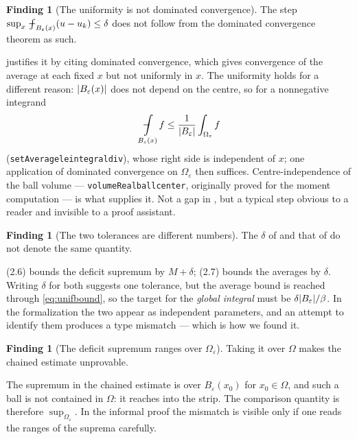 \documentclass[11pt,reqno]{amsart}
\newcommand{\fint}{\mathop{\mathrlap{\,\rule[0.62ex]{0.62em}{0.5pt}}\int}}
\newcommand{\LEANREF}[1]{\texttt{\small\def\_{\textunderscore\allowbreak}#1}}
\newcommand{\eps}{\varepsilon}
\newcommand{\avgint}{\fint}
\DeclarePairedDelimiter{\abs}{\lvert}{\rvert}
\theoremstyle{plain}
\theoremstyle{definition}
\newtheorem{finding}[theorem]{Finding}
\begin{document}
\begin{finding}[The uniformity is not dominated
convergence]\label{find:unif}
The step $\sup_{x} \avgint_{B_\eps(x)} (u - u_k) \le \delta$ does not follow
from the dominated convergence theorem as such.
\end{finding}

\cite[Thm.~2.1]{LPS14} justifies it by citing dominated convergence, which
gives convergence of the average at each fixed $x$ but not uniformly in $x$.
The uniformity holds for a different reason: $\abs{B_\eps(x)}$ does not depend
on the centre, so for a nonnegative integrand
\begin{equation}\label{eq:unifbound}
  \avgint_{B_\eps(x)} f \le \frac{1}{\abs{B_\eps}}\int_{\Omega_\eps} f
\end{equation}
(\LEANREF{setAverage\_le\_integral\_div}), whose right side is independent of
$x$; one application of dominated convergence on $\Omega_\eps$ then suffices.
Centre-independence of the ball volume ---
\LEANREF{volumeReal\_ball\_center}, originally proved for the moment
computation --- is what supplies it. Not a gap in \cite{LPS14}, but a typical
step obvious to a reader and invisible to a proof assistant.

\begin{finding}[The two tolerances are different
numbers]\label{find:tolerances}
The $\delta$ of \cite[(2.6)]{LPS14} and that of \cite[(2.7)]{LPS14} do not
denote the same quantity.
\end{finding}

(2.6) bounds the deficit supremum by $M+\delta$; (2.7) bounds the averages by
$\delta$. Writing $\delta$ for both suggests one tolerance, but the average
bound is reached through \eqref{eq:unifbound}, so the target for the
\emph{global integral} must be $\delta\abs{B_\eps}/\beta$. In the formalization
the two appear as independent parameters, and an attempt to identify them
produces a type mismatch --- which is how we found it.

\begin{finding}[The deficit supremum ranges over
$\Omega_\eps$]\label{find:supdomain}
Taking it over $\Omega$ makes the chained estimate unprovable.
\end{finding}

The supremum in the chained estimate is over $B_\eps(x_0)$ for
$x_0 \in \Omega$, and such a ball is not contained in $\Omega$: it reaches into
the strip. The comparison quantity is therefore $\sup_{\Omega_\eps}$. In the
informal proof the mismatch is visible only if one reads the ranges of the
suprema carefully.
\end{document}
